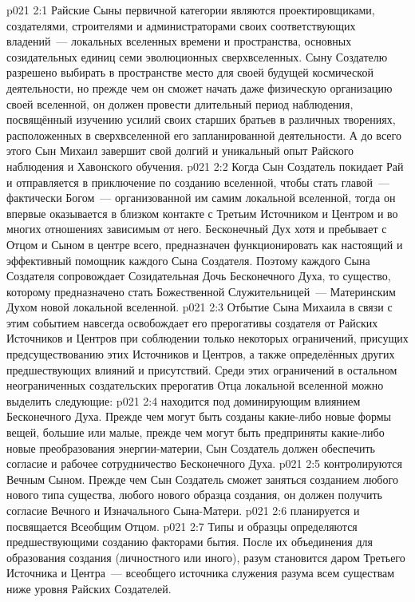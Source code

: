 \vs p021 2:1 Райские Сыны первичной категории являются проектировщиками, создателями, строителями и администраторами своих соответствующих владений~--- локальных вселенных времени и пространства, основных созидательных единиц семи эволюционных сверхвселенных. Сыну Создателю разрешено выбирать в пространстве место для своей будущей космической деятельности, но прежде чем он сможет начать даже физическую организацию своей вселенной, он должен провести длительный период наблюдения, посвящённый изучению усилий своих старших братьев в различных творениях, расположенных в сверхвселенной его запланированной деятельности. А до всего этого Сын Михаил завершит свой долгий и уникальный опыт Райского наблюдения и Хавонского обучения.
\vs p021 2:2 \pc Когда Сын Создатель покидает Рай и отправляется в приключение по созданию вселенной, чтобы стать главой~--- фактически Богом~--- организованной им самим локальной вселенной, тогда он впервые оказывается в близком контакте с Третьим Источником и Центром и во многих отношениях зависимым от него. Бесконечный Дух хотя и пребывает с Отцом и Сыном в центре всего, предназначен функционировать как настоящий и эффективный помощник каждого Сына Создателя. Поэтому каждого Сына Создателя сопровождает Созидательная Дочь Бесконечного Духа, то существо, которому предназначено стать Божественной Служительницей~--- Материнским Духом новой локальной вселенной.
\vs p021 2:3 Отбытие Сына Михаила в связи с этим событием навсегда освобождает его прерогативы создателя от Райских Источников и Центров при соблюдении только некоторых ограничений, присущих предсуществованию этих Источников и Центров, а также определённых других предшествующих влияний и присутствий. Среди этих ограничений в остальном неограниченных создательских прерогатив Отца локальной вселенной можно выделить следующие:
\vs p021 2:4  находится под доминирующим влиянием Бесконечного Духа. Прежде чем могут быть созданы какие\hyp{}либо новые формы вещей, большие или малые, прежде чем могут быть предприняты какие\hyp{}либо новые преобразования энергии\hyp{}материи, Сын Создатель должен обеспечить согласие и рабочее сотрудничество Бесконечного Духа.
\vs p021 2:5  контролируются Вечным Сыном. Прежде чем Сын Создатель сможет заняться созданием любого нового типа существа, любого нового образца создания, он должен получить согласие Вечного и Изначального Сына\hyp{}Матери.
\vs p021 2:6  планируется и посвящается Всеобщим Отцом.
\vs p021 2:7 \pc Типы и образцы  определяются предшествующими созданию факторами бытия. После их объединения для образования создания (личностного или иного), разум становится даром Третьего Источника и Центра~--- всеобщего источника служения разума всем существам ниже уровня Райских Создателей.
